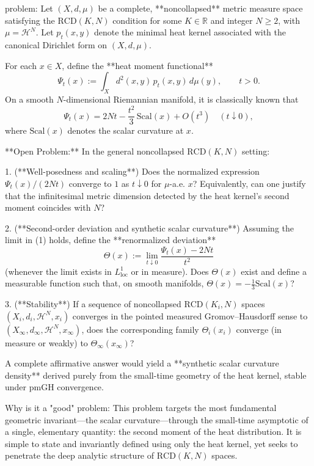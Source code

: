 problem:  
Let \((X,d,\mu)\) be a complete, **noncollapsed** metric measure space satisfying the \(\mathrm{RCD}(K,N)\) condition for some \(K\in\mathbb{R}\) and integer \(N\ge 2\), with \(\mu = \mathcal{H}^N\).  
Let \(p_t(x,y)\) denote the minimal heat kernel associated with the canonical Dirichlet form on \((X,d,\mu)\).  

For each \(x\in X\), define the **heat moment functional**
\[
\Psi_t(x):=\int_X d^2(x,y)\,p_t(x,y)\,d\mu(y),\qquad t>0.
\]
On a smooth \(N\)-dimensional Riemannian manifold, it is classically known that
\[
\Psi_t(x) = 2Nt - \frac{t^2}{3}\,\mathrm{Scal}(x) + O(t^3)
\quad (t\downarrow 0),
\]
where \(\mathrm{Scal}(x)\) denotes the scalar curvature at \(x\).  

**Open Problem:**  
In the general noncollapsed \(\mathrm{RCD}(K,N)\) setting:

1. (**Well-posedness and scaling**)  
   Does the normalized expression \(\Psi_t(x)/(2Nt)\) converge to \(1\) as \(t\downarrow0\) for \(\mu\)-a.e. \(x\)? Equivalently, can one justify that the infinitesimal metric dimension detected by the heat kernel’s second moment coincides with \(N\)?  

2. (**Second-order deviation and synthetic scalar curvature**)  
   Assuming the limit in (1) holds, define the **renormalized deviation**
   \[
   \Theta(x):=\lim_{t\downarrow0}\frac{\Psi_t(x)-2Nt}{t^2}
   \]
   (whenever the limit exists in \(L^1_{\mathrm{loc}}\) or in measure).  
   Does \(\Theta(x)\) exist and define a measurable function such that, on smooth manifolds, \(\Theta(x)=-\tfrac{1}{3}\mathrm{Scal}(x)\)?  

3. (**Stability**)  
   If a sequence of noncollapsed \(\mathrm{RCD}(K_i,N)\) spaces \((X_i,d_i,\mathcal{H}^N,x_i)\) converges in the pointed measured Gromov–Hausdorff sense to \((X_\infty,d_\infty,\mathcal{H}^N,x_\infty)\), does the corresponding family \(\Theta_i(x_i)\) converge (in measure or weakly) to \(\Theta_\infty(x_\infty)\)?  

A complete affirmative answer would yield a **synthetic scalar curvature density** derived purely from the small-time geometry of the heat kernel, stable under pmGH convergence.  

Why is it a "good" problem:  
This problem targets the most fundamental geometric invariant—the scalar curvature—through the small-time asymptotic of a single, elementary quantity: the second moment of the heat distribution. It is simple to state and invariantly defined using only the heat kernel, yet seeks to penetrate the deep analytic structure of \(\mathrm{RCD}(K,N)\) spaces.  

